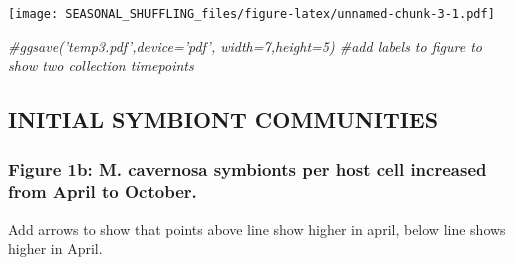 \documentclass[]{article}
\newenvironment{Shaded}{\begin{snugshade}}{\end{snugshade}}
\newcommand{\CommentTok}[1]{\textcolor[rgb]{0.56,0.35,0.01}{\textit{#1}}}
\begin{document}
\texttt{[image: SEASONAL\_SHUFFLING\_files/figure-latex/unnamed-chunk-3-1.pdf]}

\begin{Shaded}
\begin{Highlighting}[]
\CommentTok{#ggsave('temp3.pdf',device='pdf', width=7,height=5) #add labels to figure to show two collection timepoints}
\end{Highlighting}
\end{Shaded}

\hypertarget{initial-symbiont-communities}{%
\subsection{INITIAL SYMBIONT
COMMUNITIES}\label{initial-symbiont-communities}}

\hypertarget{figure-1b-m.-cavernosa-symbionts-per-host-cell-increased-from-april-to-october.}{%
\subsubsection{Figure 1b: M. cavernosa symbionts per host cell increased
from April to
October.}\label{figure-1b-m.-cavernosa-symbionts-per-host-cell-increased-from-april-to-october.}}

Add arrows to show that points above line show higher in april, below
line shows higher in April.
\end{document}
